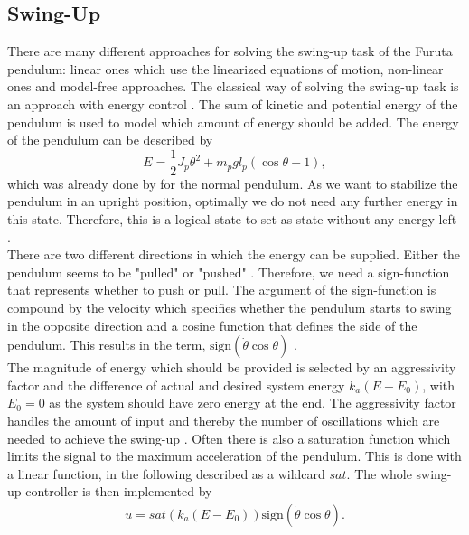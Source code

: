 \subsection{Swing-Up}
There are many different approaches for solving the swing-up task of the Furuta 
pendulum: linear ones which use the linearized equations of motion, non-linear 
ones and model-free approaches. The classical way of solving the swing-up task 
is 
an approach with energy control \citep{seman2013swinging}. The sum 
of 
kinetic and potential energy of the pendulum is used to model which amount of 
energy should be added. The energy of the pendulum can be described by 
\[E = \frac{1}{2}J_p\theta^2+m_pgl_p(\cos \theta -1),\] which was already done 
by \cite{aastrom2000swinging} for the normal pendulum.
As we want to stabilize the pendulum in an upright position, optimally we do 
not need any further energy in this state. Therefore, this is a logical state 
to set as state without any energy left \citep{seman2013swinging}.\\
There are two different directions in which the 
energy can be supplied. Either the pendulum seems to be "pulled" or "pushed" 
\citep{seman2013swinging}. Therefore, we need a sign-function that represents 
whether to push or pull. The argument of the sign-function is compound by the 
velocity which specifies whether the pendulum starts to swing in the opposite 
direction and a cosine function that defines the side of the pendulum. This 
results in 
the term, $\text{sign}(\dot{\theta}\cos\theta)$ 
\citep{awtar2002inverted}. \\
The magnitude of energy which should be provided is 
selected by an aggressivity factor and the difference of actual and desired 
system energy $k_a(E-E_0)$, with $E_0=0$ as the system should have zero energy 
at the end. The aggressivity factor handles the amount of input 
and thereby the number of oscillations which are needed to achieve the 
swing-up \citep{awtar2002inverted}. Often there is also a saturation function 
which 
limits the signal to the maximum acceleration of the pendulum. This is done 
with a linear function, in the following described as a wildcard $sat$. The 
whole 
swing-up controller is then implemented by 
\begin{align*}
u = sat(k_a(E-E_0))\text{sign}(\dot{\theta}\cos\theta).
\end{align*}
